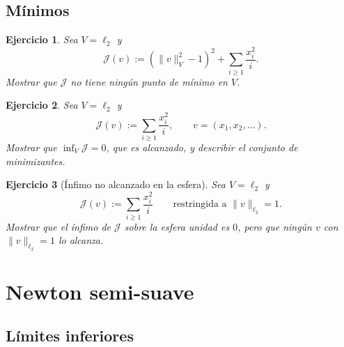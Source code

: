 \documentclass[11pt]{report}
\newtheorem{ex}{Ejercicio}
\begin{document}
\section{Mínimos}

\begin{ex}
Sea $V=\ell_2$ y
\[
\mathcal{J}(v):=
\left ( \| v \|^2_V - 1 
\right )^2 +
\sum_{i\geq1} \frac{x_i^2}{i}.
\]
Mostrar que $\mathcal{J}$ no tiene ningún punto de mínimo en $V$.
\end{ex}

\begin{ex} %
Sea $V=\ell_2$ y
\[
\mathcal{J}(v):=\sum_{i\geq 1}\frac{x_i^2}{i},\qquad v=(x_1,x_2,\dots).
\]
Mostrar que $\inf_V\mathcal J=0$, que es alcanzado, y describir el conjunto de
minimizantes.
\end{ex}


\begin{ex}[\'Infimo no alcanzado en la esfera]
Sea $V=\ell_2$ y
\[
\mathcal{J}(v):=\sum_{i\geq 1}\frac{x_i^2}{i}
\qquad\text{restringida a }\|v\|_{\ell_2}=1.
\]
Mostrar que el \'infimo de $\mathcal J$ sobre la esfera unidad es $0$, pero que
ning\'un $v$ con $\|v\|_{\ell_2}=1$ lo alcanza.
\end{ex}



\chapter{Newton semi-suave}

\section{L\'imites inferiores}
\end{document}
